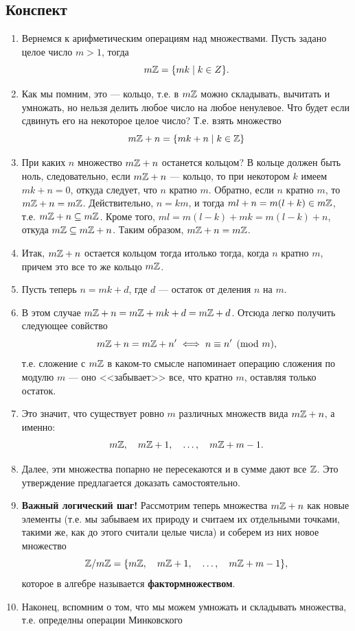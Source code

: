 \subsection*{Конспект}
\begin{enumerate}
\item Вернемся к арифметическим операциям над множествами. Пусть задано целое число $m>1$, тогда
$$
m\mathbb Z = \{mk\mid k\in Z\}.
$$
\item Как мы помним, это --- кольцо, т.е. в $m\mathbb Z$ можно складывать, вычитать и умножать, но нельзя делить любое число на любое ненулевое. Что будет если сдвинуть его на некоторое целое число? Т.е. взять множество
$$
m\mathbb Z+n = \{mk+n\mid k\in\mathbb Z\}
$$
\item При каких $n$ множество $m\mathbb Z+n$ останется кольцом? В кольце должен быть ноль, следовательно, если $m\mathbb Z+n$ --- кольцо, то при некотором $k$ имеем $mk+n=0$, откуда следует, что $n$ кратно $m$. Обратно, если $n$ кратно $m$, то $m\mathbb Z+n=m\mathbb Z$. Действительно, $n=km$, и тогда $ml+n=m(l+k)\in m\mathbb Z$, т.е. $m\mathbb Z+n\subseteq m\mathbb Z$. Кроме того, $ml=m(l-k)+mk=m(l-k)+n$, откуда $m\mathbb Z\subseteq m\mathbb Z+n$. Таким образом, $m\mathbb Z+n=m\mathbb Z$.
\item Итак, $m\mathbb Z+n$ остается кольцом тогда итолько тогда, когда $n$ кратно $m$, причем это все то же кольцо $m\mathbb Z$.
\item Пусть теперь $n=mk+d$, где $d$ --- остаток от деления $n$ на $m$.
\item В этом случае $m\mathbb Z+n=m\mathbb Z+mk+d=m\mathbb Z+d$. Отсюда легко получить следующее совйство
$$
m\mathbb Z+n = m\mathbb Z+n' \iff n\equiv n' \pmod m,
$$
т.е. сложение с $m\mathbb Z$ в каком-то смысле напоминает операцию сложения по модулю $m$ --- оно <<забывает>> все, что кратно $m$, оставляя только остаток.
\item Это значит, что существует ровно $m$ различных множеств вида $m\mathbb Z+n$, а именно:
$$
m\mathbb Z,\quad m\mathbb Z+1,\quad\dots,\quad m\mathbb Z+m-1.
$$
\item Далее, эти множества попарно не пересекаются и в сумме дают все $\mathbb Z$. Это утверждение предлагается доказать самостоятельно.
\item \textbf{Важный логический шаг!} Рассмотрим теперь множества $m\mathbb Z+n$ как новые элементы (т.е. мы забываем их природу и считаем их отдельными точками, такими же, как до этого считали целые числа) и соберем из них новое множество
$$
\mathbb Z/m\mathbb Z = \{m\mathbb Z,\quad m\mathbb Z+1,\quad\dots,\quad m\mathbb Z+m-1\},
$$
которое в алгебре называется \textbf{фактормножеством}.
\item Наконец, вспомним о том, что мы можем умножать и складывать множества, т.е. определны операции Минковского

\end{enumerate}
